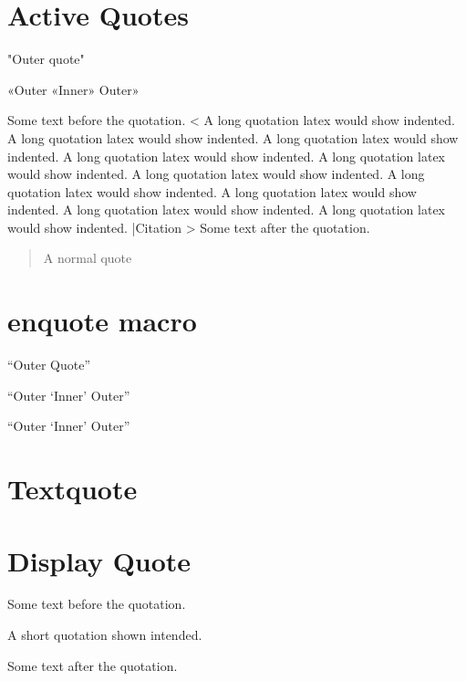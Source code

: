 \documentclass[a4paper]{article}
\begin{document}
\section{Active Quotes}

"Outer quote"

«Outer «Inner» Outer»

Some text before the quotation. 
< A long quotation latex would show indented. 
A long quotation latex would show indented. 
A long quotation latex would show indented. 
A long quotation latex would show indented. 
A long quotation latex would show indented. 
A long quotation latex would show indented. 
A long quotation latex would show indented. 
A long quotation latex would show indented. 
A long quotation latex would show indented. 
A long quotation latex would show indented. 
|Citation >
Some text after the quotation. 

\begin{quote}
A normal quote
\end{quote}

\section{enquote macro}

\enquote{Outer Quote}

\enquote{Outer \enquote{Inner} Outer}

\enquote{Outer \enquote*{Inner} Outer}

\section{Textquote}


\section{Display Quote}

Some text before the quotation. 
\begin{displayquote}[Citation]
A short quotation shown intended.
\end{displayquote}
Some text after the quotation. 
\end{document}
